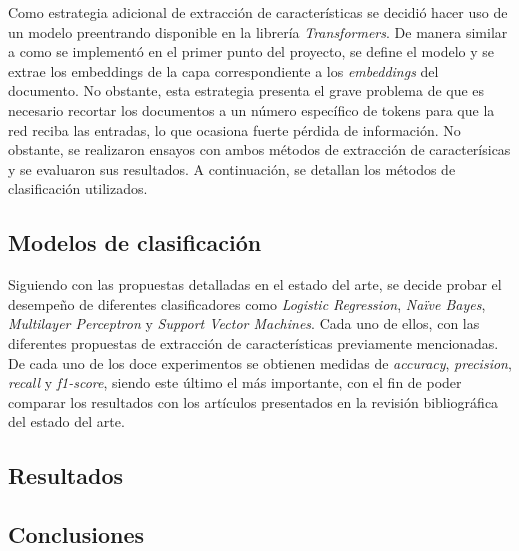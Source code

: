 Como estrategia adicional de extracción de características se decidió hacer uso de un modelo preentrando disponible en la librería \textit{Transformers}. De manera similar a como se implementó en el primer punto del proyecto, se define el modelo y se extrae los embeddings de la capa correspondiente a los \textit{embeddings} del documento. No obstante, esta estrategia presenta el grave problema de que es necesario recortar los documentos a un número específico de tokens para que la red reciba las entradas, lo que ocasiona fuerte pérdida de información. No obstante, se realizaron ensayos con ambos métodos de extracción de caracterísicas y se evaluaron sus resultados. A continuación, se detallan los métodos de clasificación utilizados.

\subsection{Modelos de clasificación}
Siguiendo con las propuestas detalladas en el estado del arte, se decide probar el desempeño de diferentes clasificadores como \textit{Logistic Regression}, \textit{Naïve Bayes}, \textit{Multilayer Perceptron} y \textit{Support Vector Machines}. Cada uno de ellos, con las diferentes propuestas de extracción de características previamente mencionadas. De cada uno de los doce experimentos se obtienen medidas de \textit{accuracy}, \textit{precision}, \textit{recall} y \textit{f1-score}, siendo este último el más importante, con el fin de poder comparar los resultados con los artículos presentados en la revisión bibliográfica del estado del arte.

\subsection{Resultados}


\subsection{Conclusiones}

